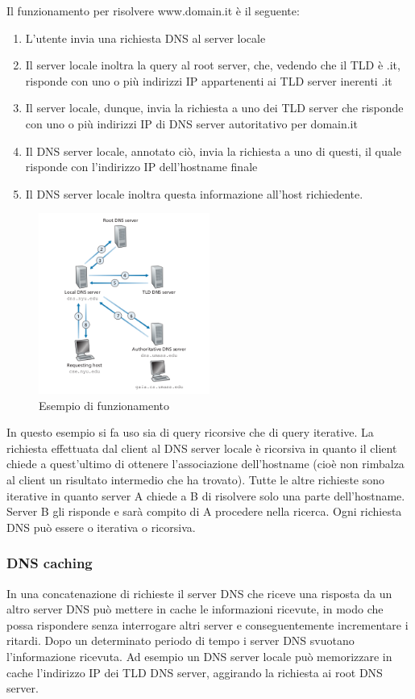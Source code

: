\documentclass{book}
\begin{document}
Il funzionamento per risolvere www.domain.it è il seguente:
\begin{enumerate}
	\item L'utente invia una richiesta DNS al server locale
	\item Il server locale inoltra la query al root server, che, vedendo che il TLD è .it, risponde con uno o più indirizzi IP appartenenti ai TLD server inerenti .it
	\item Il server locale, dunque, invia la richiesta a uno dei TLD server che risponde con uno o più indirizzi IP di DNS server autoritativo per domain.it
	\item Il DNS server locale, annotato ciò, invia la richiesta a uno di questi, il quale risponde con l'indirizzo IP dell'hostname finale
	\item Il DNS server locale inoltra questa informazione all'host richiedente.
\end{enumerate}

\begin{figure}[h]
	\centering
	\includegraphics[width=0.5\textwidth]{images/dns_query_example.png}
	\caption{Esempio di funzionamento}
	\label{fig:esempio}
\end{figure}


In questo esempio si fa uso sia di query ricorsive che di query iterative. La richiesta effettuata dal client al DNS server locale è ricorsiva in quanto il client chiede a quest'ultimo di ottenere l'associazione dell'hostname (cioè non rimbalza al client un risultato intermedio che ha trovato). Tutte le altre richieste sono iterative in quanto server A chiede a B di risolvere solo una parte dell'hostname. Server B gli risponde e sarà compito di A procedere nella ricerca. Ogni richiesta DNS può essere o iterativa o ricorsiva.

\subsubsection*{DNS caching}
In una concatenazione di richieste il server DNS che riceve una risposta da un altro server DNS può mettere in cache le informazioni ricevute, in modo che possa rispondere senza interrogare altri server e conseguentemente incrementare i ritardi. Dopo un determinato periodo di tempo i server DNS svuotano l'informazione ricevuta. Ad esempio un DNS server locale può memorizzare in cache l'indirizzo IP dei TLD DNS server, aggirando la richiesta ai root DNS server.
\end{document}
